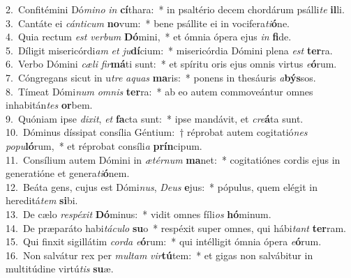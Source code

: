{2.~}Confitémini Dó\textit{mi}\textit{no} \textit{in} \textbf{cí}thara:~* in psaltério decem chordárum psálli\textit{te} \textbf{il}li.\\
{3.~}Cantáte ei \textit{cán}\textit{ti}\textit{cum} \textbf{no}vum:~* bene psállite ei in vocifera\textit{ti}\textbf{ó}ne.\\
{4.~}Quia rectum \textit{est} \textit{ver}\textit{bum} \textbf{Dó}mini,~* et ómnia ópera ejus \textit{in} \textbf{fi}de.\\
{5.~}Díligit misericórdi\textit{am} \textit{et} \textit{ju}\textbf{dí}cium:~* misericórdia Dómini plena \textit{est} \textbf{ter}ra.\\
{6.~}Verbo Dómini \textit{cæ}\textit{li} \textit{fir}\textbf{má}ti sunt:~* et spíritu oris ejus omnis virtus \textit{e}\textbf{ó}rum.\\
{7.~}Cóngregans sicut in u\textit{tre} \textit{a}\textit{quas} \textbf{ma}ris:~* ponens in thesáuris \textit{a}\textbf{býs}sos.\\
{8.~}Tímeat Dómi\textit{num} \textit{om}\textit{nis} \textbf{ter}ra:~* ab eo autem commoveántur omnes inhabitán\textit{tes} \textbf{or}bem.\\
{9.~}Quóniam ipse \textit{di}\textit{xit}, \textit{et} \textbf{fa}cta sunt:~* ipse mandávit, et \textit{cre}\textbf{á}ta sunt.\\
{10.~}Dóminus díssipat consília Géntium:~† réprobat autem cogitatió\textit{nes} \textit{po}\textit{pu}\textbf{ló}rum,~* et réprobat consíli\textit{a} \textbf{prín}cipum.\\
{11.~}Consílium autem Dómini in \textit{æ}\textit{tér}\textit{num} \textbf{ma}net:~* cogitatiónes cordis ejus in generatióne et genera\textit{ti}\textbf{ó}nem.\\
{12.~}Beáta gens, cujus est Dómi\textit{nus}, \textit{De}\textit{us} \textbf{e}jus:~* pópulus, quem elégit in hereditá\textit{tem} \textbf{si}bi.\\
{13.~}De cælo \textit{re}\textit{spé}\textit{xit} \textbf{Dó}minus:~* vidit omnes fíli\textit{os} \textbf{hó}minum.\\
{14.~}De præparáto habi\textit{tá}\textit{cu}\textit{lo} \textbf{su}o~* respéxit super omnes, qui hábi\textit{tant} \textbf{ter}ram.\\
{15.~}Qui finxit sigillátim \textit{cor}\textit{da} \textit{e}\textbf{ó}rum:~* qui intélligit ómnia ópera \textit{e}\textbf{ó}rum.\\
{16.~}Non salvátur rex per \textit{mul}\textit{tam} \textit{vir}\textbf{tú}tem:~* et gigas non salvábitur in multitúdine virtú\textit{tis} \textbf{su}æ.\\
